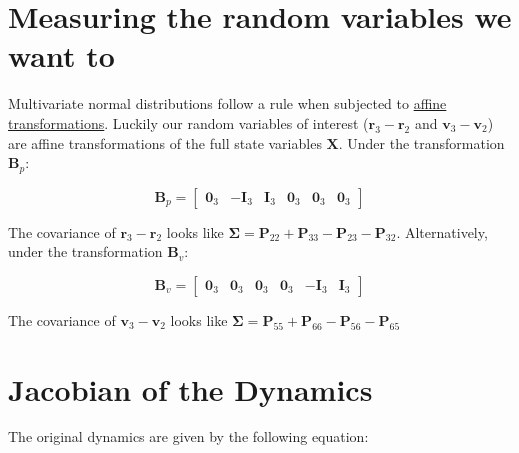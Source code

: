 \documentclass[]{article}
\begin{document}
	\section{Measuring the random variables we want to}

	Multivariate normal distributions follow a rule when subjected to \href{https://en.wikipedia.org/wiki/Multivariate_normal_distribution#Affine_transformation}{affine transformations}.  Luckily our random variables of interest ($\mathbf{r}_3 - \mathbf{r}_2$ and $\mathbf{v}_3 - \mathbf{v}_2$) are affine transformations of the full state variables $\mathbf{X}$.  Under the transformation $\mathbf{B}_p$:

	\begin{equation*}
		\mathbf{B}_p = \begin{bmatrix}
			\mathbf{0}_3 & -\mathbf{I}_3 & \mathbf{I}_3 & \mathbf{0}_3 & \mathbf{0}_3 & \mathbf{0}_3
		\end{bmatrix}
	\end{equation*}

	The covariance of $\mathbf{r}_3 - \mathbf{r}_2$ looks like $\boldsymbol{\Sigma} = \mathbf{P}_{22} + \mathbf{P}_{33} - \mathbf{P}_{23} - \mathbf{P}_{32}$.  Alternatively, under the transformation $\mathbf{B}_v$:

	\begin{equation*}
		\mathbf{B}_v = \begin{bmatrix}
			\mathbf{0}_3 & \mathbf{0}_3 & \mathbf{0}_3 & \mathbf{0}_3 & -\mathbf{I}_3 & \mathbf{I}_3
		\end{bmatrix}
	\end{equation*}

	The covariance of $\mathbf{v}_3 - \mathbf{v}_2$ looks like $\boldsymbol{\Sigma} = \mathbf{P}_{55} + \mathbf{P}_{66} - \mathbf{P}_{56} - \mathbf{P}_{65}$

	\section{Jacobian of the Dynamics}

	The original dynamics are given by the following equation:
\end{document}
